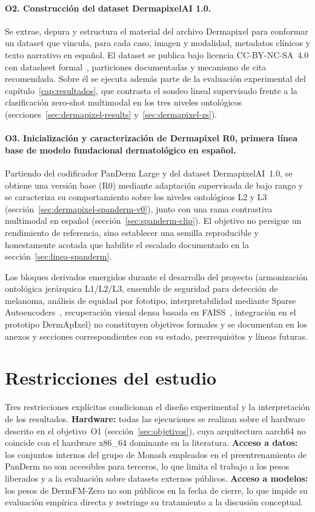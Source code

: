 \paragraph{O2. Construcción del dataset DermapixelAI 1.0.}
Se extrae, depura y estructura el material del archivo Dermapixel
para conformar un dataset que vincula, para cada caso, imagen y
modalidad, metadatos clínicos y texto narrativo en español. El
dataset se publica bajo licencia CC-BY-NC-SA~4.0 con datasheet
formal~\cite{datasheets2018}, particiones documentadas y mecanismo
de cita recomendada. Sobre él se ejecuta además parte de la
evaluación experimental del capítulo~\ref{cap:resultados}, que
contrasta el sondeo lineal supervisado frente a la clasificación
zero-shot multimodal en los tres niveles ontológicos
(secciones~\ref{sec:dermapixel-results} y~\ref{sec:dermapixel-zs}).

\paragraph{O3. Inicialización y caracterización de Dermapixel R0,
primera línea base de modelo fundacional dermatológico en español.}
Partiendo del codificador PanDerm Large y del dataset
DermapixelAI~1.0, se obtiene una versión base (R0) mediante
adaptación supervisada de bajo rango y se caracteriza su
comportamiento sobre los niveles ontológicos L2 y L3
(sección~\ref{sec:dermapixel-spanderm-v0}), junto con una rama
contrastiva multimodal en español (sección~\ref{sec:spanderm-clip}).
El objetivo no persigue un rendimiento de referencia, sino establecer
una semilla reproducible y honestamente acotada que habilite el
escalado documentado en la sección~\ref{sec:linea-spanderm}.

Los bloques derivados emergidos durante el desarrollo del proyecto
(armonización ontológica jerárquica L1/L2/L3, ensemble de seguridad
para detección de melanoma, análisis de equidad por fototipo,
interpretabilidad mediante Sparse Autoencoders~\cite{templeton2024},
recuperación visual densa basada en FAISS~\cite{faiss2019},
integración en el prototipo DermApIxel) no constituyen objetivos
formales y se documentan en los anexos y secciones correspondientes
con su estado, prerrequisitos y líneas futuras.


\section{Restricciones del estudio}
\label{sec:alcance}

Tres restricciones explícitas condicionan el diseño experimental y
la interpretación de los resultados. \textbf{Hardware:} todas las
ejecuciones se realizan sobre el hardware descrito en el
objetivo~O1 (sección~\ref{sec:objetivos}), cuya arquitectura
aarch64 no coincide con el hardware x86\_64 dominante en la
literatura. \textbf{Acceso a datos:} los
conjuntos internos del grupo de Monash empleados en el
preentrenamiento de PanDerm no son accesibles para terceros, lo que
limita el trabajo a los pesos liberados y a la evaluación sobre
datasets externos públicos. \textbf{Acceso a modelos:} los pesos
de DermFM-Zero no son públicos en la fecha de cierre, lo que impide
su evaluación empírica directa y restringe su tratamiento a la
discusión conceptual.

